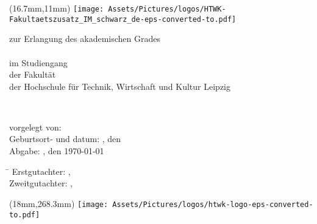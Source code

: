 

\begin{titlepage}
	\noindent
\begin{textblock*}{4.74cm}(16.7mm,11mm)
\texttt{[image: Assets/Pictures/logos/HTWK-Fakultaetszusatz\_IM\_schwarz\_de-eps-converted-to.pdf]}
\end{textblock*}
\begin{center}

\vspace*{0.5cm}

\large
{\textsc{\Large \abschlussarbeit}}

\vspace*{0.5cm}
zur Erlangung des akademischen Grades\\[0.6cm]
\studienganggrad\\[0.6cm]
im Studiengang \studiengang\\
der Fakultät \\
der Hochschule für Technik, Wirtschaft und Kultur Leipzig

\vspace*{0.8cm}
{\LARGE \textbf{\titel}}\\
\vspace*{0.5cm}
{\Large \textbf{\subtitel}}

\end{center}


\vspace*{1.3cm}
vorgelegt von: \autor \\
Geburtsort- und datum: \geburtsort, den \geburtstag \\
Abgabe: \ort, den \today



\vspace*{1cm}
\large
\begin{tabbing}
\hspace{4cm}\=\kill
Erstgutachter:  \> \erstgutachter, \instituteErstgutachter\\ 
Zweitgutachter: \> \zweitgutachter, \instituteZweitgutachter
\end{tabbing} 

\begin{textblock*}{8.41cm}(18mm,268.3mm)
\texttt{[image: Assets/Pictures/logos/htwk-logo-eps-converted-to.pdf]}
\end{textblock*}

\end{titlepage}
